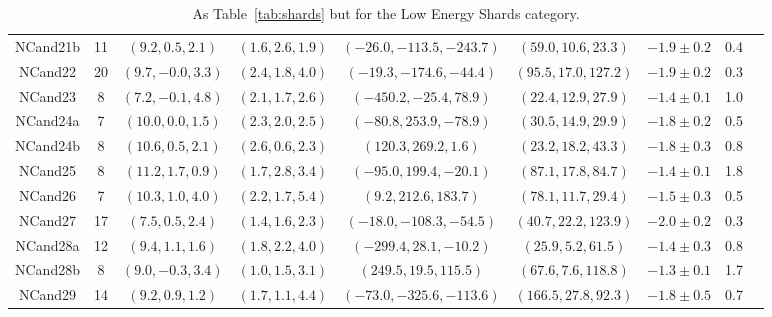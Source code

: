\begin{table}[t!]
\begin{tabularx}{0.95\textwidth}{c|cccccccc}
NCand21b & 11        & $(9.2,0.5,2.1)$   & $(1.6,2.6,1.9)$                      & $(-26.0,-113.5,-243.7)$  & $(59.0,10.6,23.3)$                & $-1.9\pm 0.2$ & 0.4 \\
NCand22  & 20        & $(9.7,-0.0,3.3)$  & $(2.4,1.8,4.0)$                      & $(-19.3,-174.6,-44.4)$   & $(95.5,17.0,127.2)$               & $-1.9\pm 0.2$ & 0.3 \\
NCand23  & 8         & $(7.2,-0.1,4.8)$  & $(2.1,1.7,2.6)$                      & $(-450.2,-25.4,78.9)$    & $(22.4,12.9,27.9)$                & $-1.4\pm 0.1$ & 1.0 \\
NCand24a & 7         & $(10.0,0.0,1.5)$  & $(2.3,2.0,2.5)$                      & $(-80.8,253.9,-78.9)$    & $(30.5,14.9,29.9)$                & $-1.8\pm 0.2$ & 0.5 \\
NCand24b & 8         & $(10.6,0.5,2.1)$  & $(2.6,0.6,2.3)$                      & $(120.3,269.2,1.6)$      & $(23.2,18.2,43.3)$                & $-1.8\pm 0.3$ & 0.8 \\
NCand25  & 8         & $(11.2,1.7,0.9)$  & $(1.7,2.8,3.4)$                      & $(-95.0,199.4,-20.1)$    & $(87.1,17.8,84.7)$                & $-1.4\pm 0.1$ & 1.8 \\
NCand26  & 7         & $(10.3,1.0,4.0)$  & $(2.2,1.7,5.4)$                      & $(9.2,212.6,183.7)$      & $(78.1,11.7,29.4)$                & $-1.5\pm 0.3$ & 0.5 \\
NCand27  & 17        & $(7.5,0.5,2.4)$   & $(1.4,1.6,2.3)$                      & $(-18.0,-108.3,-54.5)$   & $(40.7,22.2,123.9)$               & $-2.0\pm 0.2$ & 0.3 \\
NCand28a & 12        & $(9.4,1.1,1.6)$   & $(1.8,2.2,4.0)$                      & $(-299.4,28.1,-10.2)$    & $(25.9,5.2,61.5)$                 & $-1.4\pm 0.3$ & 0.8 \\
NCand28b & 8         & $(9.0,-0.3,3.4)$  & $(1.0,1.5,3.1)$                      & $(249.5,19.5,115.5)$     & $(67.6,7.6,118.8)$                & $-1.3\pm 0.1$ & 1.7 \\
NCand29  & 14        & $(9.2,0.9,1.2)$   & $(1.7,1.1,4.4)$                      & $(-73.0,-325.6,-113.6)$  & $(166.5,27.8,92.3)$               & $-1.8\pm 0.5$ & 0.7\\

\hline\hline
 \end{tabularx}
\caption{As Table~\ref{tab:shards} but for the Low Energy Shards category.} 
\label{tab:restofshards}
\end{table}
